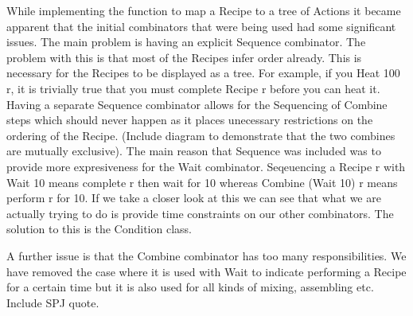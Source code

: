 While implementing the function to map a Recipe to a tree of Actions it became apparent that the initial
combinators that were being used had some significant issues. The main problem is having an explicit Sequence
combinator. The problem with this is that most of the Recipes infer order already. This is necessary for the
Recipes to be displayed as a tree. For example, if you Heat 100 r, it is trivially true that you must complete
Recipe r before you can heat it. Having a separate Sequence combinator allows for the Sequencing of Combine steps
which should never happen as it places unecessary restrictions on the ordering of the Recipe. (Include diagram
to demonstrate that the two combines are mutually exclusive). The main reason that Sequence was included was to
provide more expresiveness for the Wait combinator. Seqeuencing a Recipe r with Wait 10 means complete r then
wait for 10 whereas Combine (Wait 10) r means perform r for 10. If we take a closer look at this we can see that
what we are actually trying to do is provide time constraints on our other combinators. The solution to this is
the Condition class.

A further issue is that the Combine combinator has too many responsibilities. We have removed the case where it
is used with Wait to indicate performing a Recipe for a certain time but it is also used for all kinds of mixing,
assembling etc. Include SPJ quote.